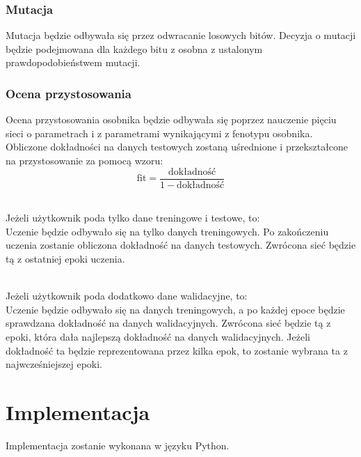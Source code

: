 \subsubsection{Mutacja}
Mutacja będzie odbywała się przez odwracanie losowych bitów.
Decyzja o mutacji będzie podejmowana dla każdego bitu
z osobna z ustalonym prawdopodobieństwem mutacji.

\subsubsection{Ocena przystosowania}
Ocena przystosowania osobnika będzie odbywała się poprzez nauczenie
pięciu sieci o parametrach i z parametrami wynikającymi
z fenotypu osobnika.
Obliczone dokładności na danych testowych zostaną uśrednione
i przekształcone na przystosowanie za pomocą wzoru:
$$
\mbox{fit} = \frac{\mbox{dokładność}}{1 - \mbox{dokładność}} %
$$

\noindent\\
Jeżeli użytkownik poda tylko dane treningowe i testowe, to:\\
Uczenie będzie odbywało się na tylko danych treningowych.
Po zakończeniu uczenia zostanie obliczona dokładność na danych testowych.
Zwrócona sieć będzie tą z ostatniej epoki uczenia.

\noindent\\
Jeżeli użytkownik poda dodatkowo dane walidacyjne, to:\\
Uczenie będzie odbywało się na danych treningowych,
a po każdej epoce będzie sprawdzana dokładność na danych walidacyjnych.
Zwrócona sieć będzie tą z epoki,
która dała najlepszą dokładność na danych walidacyjnych.
Jeżeli dokładność ta będzie reprezentowana przez kilka epok,
to zostanie wybrana ta z najwcześniejszej epoki. %

\section{Implementacja}
Implementacja zostanie wykonana w języku Python.

